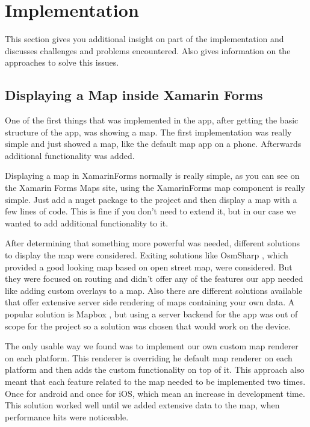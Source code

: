 \section{Implementation}
This section gives you additional insight on part of the implementation and discusses challenges and problems encountered. Also gives information on the approaches to solve this issues.

\subsection{Displaying a Map inside Xamarin Forms}
One of the first things that was implemented in the app, after getting the basic structure of the app, was showing a map. The first implementation was really simple and just showed a map, like the default map app on a phone. Afterwards additional functionality was added.

Displaying a map in \gls{XamarinForms} normally is really simple, as you can see on the Xamarin Forms Maps \cite{xamMaps} site, using the \gls{XamarinForms} map component is really simple. Just add a \gls{nuget} package to the project and then display a map with a few lines of code. This is fine if you don't need to extend it, but in our case we wanted to add additional functionality to it.

After determining that something more powerful was needed, different solutions to display the map were considered. Exiting solutions like
OsmSharp \cite{osmsharp}, which provided a good looking map based on open street map, were considered. But they were focused on routing and didn't offer any of the features our app needed like adding custom \glspl{overlay} to a map.
Also there are different solutions available that offer extensive server side rendering of maps containing your own data. A popular solution is Mapbox \cite{mapbox}, but using a server backend for the app was out of scope for the project so a solution was chosen that would work on the device.

The only usable way we found was to implement our own custom map \gls{renderer} on each platform. This \gls{renderer} is overriding he default map \gls{renderer} on each platform and then adds the custom functionality on top of it. This approach also meant that each feature related to the map needed to be implemented two times. Once for android and once for iOS, which mean an increase in development time. This solution worked well until we added extensive data to the map, when performance hits were noticeable.

